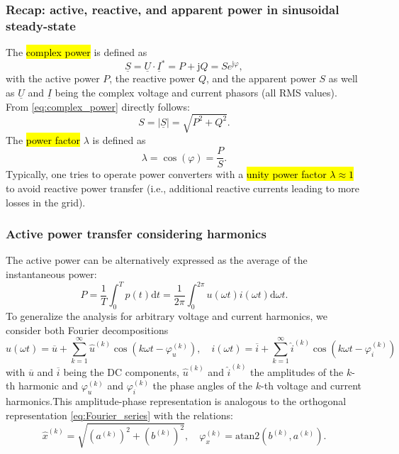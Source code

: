\begin{frame}
	\frametitle{Recap: active, reactive, and apparent power in sinusoidal steady-state}
	The \hl{complex power} is defined as
	\begin{equation}
		\underline{S} = \underline{U} \cdot \underline{I}^* = P + \mathrm{j}Q = S e^{ \mathrm{j} \varphi},
		\label{eq:complex_power}
	\end{equation}
	with the active power $P$, the reactive power $Q$, and the apparent power $S$ as well as $\underline{U}$ and $\underline{I}$ being the complex voltage and current phasors (all RMS values). \pause From \eqref{eq:complex_power} directly follows:
	\begin{equation}
		S = |\underline{S}| = \sqrt{P^2 + Q^2}.
	\end{equation}\pause
	The \hl{power factor} $\lambda$ is defined as
	\begin{equation}
		\lambda =\cos(\varphi) = \frac{P}{S}.
	\end{equation}\pause
	Typically, one tries to operate power converters with a \hl{unity power factor $\lambda \approx 1$} to avoid reactive power transfer (i.e., additional reactive currents leading to more losses in the grid).
\end{frame}

\begin{frame}
	\frametitle{Active power transfer considering harmonics}
	The active power can be alternatively expressed as the average of the instantaneous power:
	\begin{equation}
		P = \frac{1}{T} \int_{0}^{T} p(t) \mathrm{d}t = \frac{1}{2\pi} \int_{0}^{2\pi} u(\omega t) i(\omega t) \mathrm{d}\omega t.
	\end{equation}\pause
	To generalize the analysis for arbitrary voltage and current harmonics, we consider both  Fourier decompositions
	\begin{equation}
		u(\omega t) = \overline{u} + \sum_{k=1}^{\infty} \hat{u}^{(k)}\cos(k\omega t -\varphi_u^{(k)}),\quad
		i(\omega t) = \overline{i} + \sum_{k=1}^{\infty} \hat{i}^{(k)}\cos(k\omega t -\varphi_i^{(k)})
	\end{equation}
	with $\overline{u}$ and $\overline{i}$ being the DC components, $\hat{u}^{(k)}$ and $\hat{i}^{(k)}$ the amplitudes of the $k$-th harmonic and $\varphi_u^{(k)}$ and $\varphi_i^{(k)}$ the phase angles of the $k$-th voltage and current harmonics.\pause This amplitude-phase representation is analogous to the orthogonal representation \eqref{eq:Fourier_series} with the relations:
	\begin{equation}
		\hat{x}^{(k)} = \sqrt{(a^{(k)})^2 + (b^{(k)})^2}, \quad \varphi_x^{(k)} = \mathrm{atan2}\left(b^{(k)}, a^{(k)}\right).
	\end{equation}
\end{frame}

